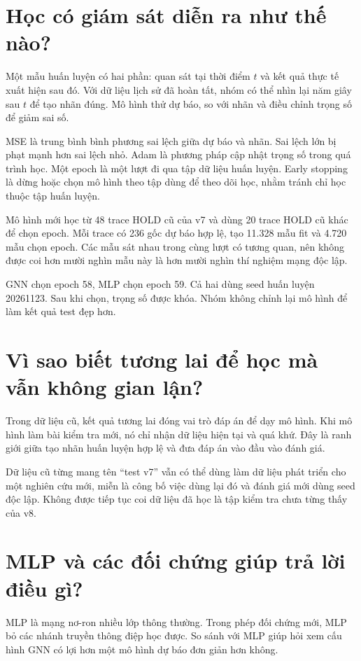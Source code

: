 \section{Học có giám sát diễn ra như thế nào?}
Một mẫu huấn luyện có hai phần: quan sát tại thời điểm $t$ và kết quả thực tế xuất hiện sau đó. Với dữ liệu lịch sử đã hoàn tất, nhóm có thể nhìn lại năm giây sau $t$ để tạo nhãn đúng. Mô hình thử dự báo, so với nhãn và điều chỉnh trọng số để giảm sai số.

MSE là trung bình bình phương sai lệch giữa dự báo và nhãn. Sai lệch lớn bị phạt mạnh hơn sai lệch nhỏ. Adam là phương pháp cập nhật trọng số trong quá trình học. Một epoch là một lượt đi qua tập dữ liệu huấn luyện. Early stopping là dừng hoặc chọn mô hình theo tập dùng để theo dõi học, nhằm tránh chỉ học thuộc tập huấn luyện.

Mô hình mới học từ 48 trace HOLD cũ của v7 và dùng 20 trace HOLD cũ khác để chọn epoch. Mỗi trace có 236 gốc dự báo hợp lệ, tạo 11.328 mẫu fit và 4.720 mẫu chọn epoch. Các mẫu sát nhau trong cùng lượt có tương quan, nên không được coi hơn mười nghìn mẫu này là hơn mười nghìn thí nghiệm mạng độc lập.

GNN chọn epoch 58, MLP chọn epoch 59. Cả hai dùng seed huấn luyện 20261123. Sau khi chọn, trọng số được khóa. Nhóm không chỉnh lại mô hình để làm kết quả test đẹp hơn.

\section{Vì sao biết tương lai để học mà vẫn không gian lận?}
Trong dữ liệu cũ, kết quả tương lai đóng vai trò đáp án để dạy mô hình. Khi mô hình làm bài kiểm tra mới, nó chỉ nhận dữ liệu hiện tại và quá khứ. Đây là ranh giới giữa tạo nhãn huấn luyện hợp lệ và đưa đáp án vào đầu vào đánh giá.

Dữ liệu cũ từng mang tên ``test v7'' vẫn có thể dùng làm dữ liệu phát triển cho một nghiên cứu mới, miễn là công bố việc dùng lại đó và đánh giá mới dùng seed độc lập. Không được tiếp tục coi dữ liệu đã học là tập kiểm tra chưa từng thấy của v8.

\section{MLP và các đối chứng giúp trả lời điều gì?}
MLP là mạng nơ-ron nhiều lớp thông thường. Trong phép đối chứng mới, MLP bỏ các nhánh truyền thông điệp học được. So sánh với MLP giúp hỏi xem cấu hình GNN có lợi hơn một mô hình dự báo đơn giản hơn không.

